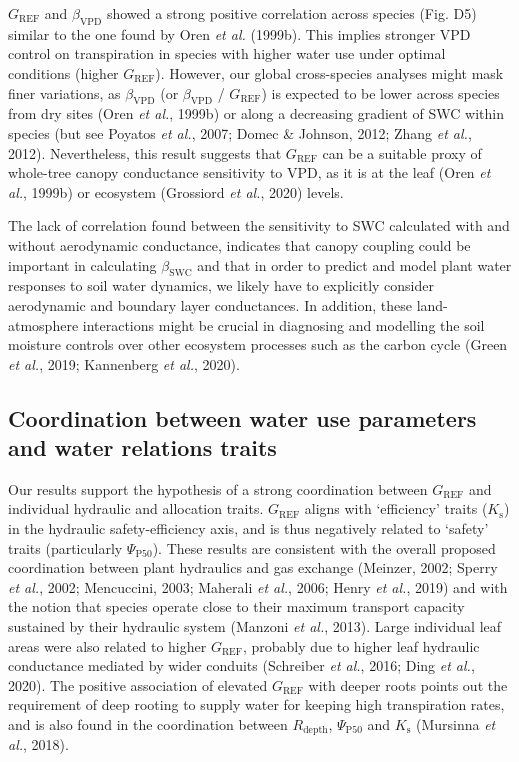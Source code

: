 \documentclass[11pt,twoside]{reedthesis}
\begin{document}
\(G_{\text{REF}}\) and \(\beta_{\text{VPD}}\) showed a strong positive
correlation across species (Fig. D5) similar to the one found by Oren
\emph{et al.} (1999b). This implies stronger VPD control on
transpiration in species with higher water use under optimal conditions
(higher \(G_{\text{REF}}\)). However, our global cross-species analyses
might mask finer variations, as \(\beta_{\text{VPD}}\) (or
\(\beta_{\text{VPD}}\) / \(G_{\text{REF}}\)) is expected to be lower
across species from dry sites (Oren \emph{et al.}, 1999b) or along a
decreasing gradient of SWC within species (but see Poyatos \emph{et
al.}, 2007; Domec \& Johnson, 2012; Zhang \emph{et al.}, 2012).
Nevertheless, this result suggests that \(G_{\text{REF}}\) can be a
suitable proxy of whole-tree canopy conductance sensitivity to VPD, as
it is at the leaf (Oren \emph{et al.}, 1999b) or ecosystem (Grossiord
\emph{et al.}, 2020) levels.\par

The lack of correlation found between the sensitivity to SWC calculated
with and without aerodynamic conductance, indicates that canopy coupling
could be important in calculating \(\beta_{\text{SWC}}\) and that in
order to predict and model plant water responses to soil water dynamics,
we likely have to explicitly consider aerodynamic and boundary layer
conductances. In addition, these land-atmosphere interactions might be
crucial in diagnosing and modelling the soil moisture controls over
other ecosystem processes such as the carbon cycle (Green \emph{et al.},
2019; Kannenberg \emph{et al.}, 2020).\par

\subsection{Coordination between water use parameters and water
relations
traits}\label{coordination-between-water-use-parameters-and-water-relations-traits}

Our results support the hypothesis of a strong coordination between
\(G_{\text{REF}}\) and individual hydraulic and allocation traits.
\(G_{\text{REF}}\) aligns with `efficiency' traits (\(K_\text{s}\)) in
the hydraulic safety-efficiency axis, and is thus negatively related to
`safety' traits (particularly \(\Psi_{\text{P50}}\)). These results are
consistent with the overall proposed coordination between plant
hydraulics and gas exchange (Meinzer, 2002; Sperry \emph{et al.}, 2002;
Mencuccini, 2003; Maherali \emph{et al.}, 2006; Henry \emph{et al.},
2019) and with the notion that species operate close to their maximum
transport capacity sustained by their hydraulic system (Manzoni \emph{et
al.}, 2013). Large individual leaf areas were also related to higher
\(G_{\text{REF}}\), probably due to higher leaf hydraulic conductance
mediated by wider conduits (Schreiber \emph{et al.}, 2016; Ding \emph{et
al.}, 2020). The positive association of elevated \(G_{\text{REF}}\)
with deeper roots points out the requirement of deep rooting to supply
water for keeping high transpiration rates, and is also found in the
coordination between \(R_{\text{depth}}\), \(\Psi_{\text{P50}}\) and
\(K_\text{s}\) (Mursinna \emph{et al.}, 2018).\par
\end{document}
